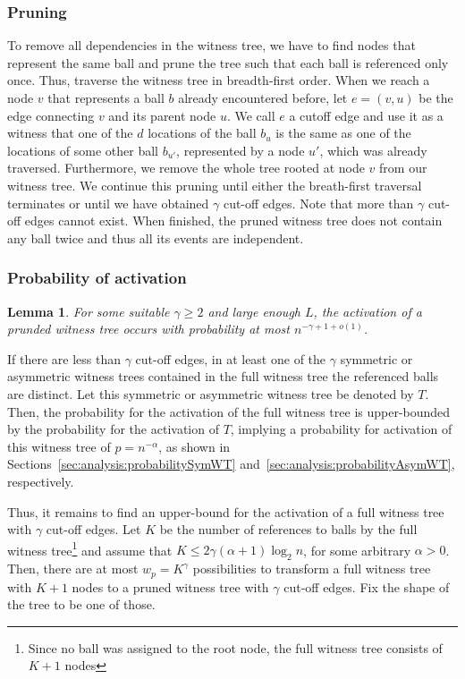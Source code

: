\documentclass[a4paper,12pt]{article}
\newtheorem{lemma}{Lemma}
\begin{document}
\subsubsection{Pruning}
\label{sec:analysis:pruningFullWT}
To remove all dependencies in the witness tree, we have to find nodes that represent the same ball and prune the tree such that each ball is referenced only once. Thus, traverse the witness tree in breadth-first order. When we reach a node $v$ that represents a ball $b$ already encountered before, let $e = (v,u)$ be the edge connecting $v$ and its parent node $u$. We call $e$ a cutoff edge and use it as a witness that one of the $d$ locations of the ball $b_u$ is the same as one of the locations of some other ball $b_{u'}$, represented by a node $u'$, which was already traversed. Furthermore, we remove the whole tree rooted at node $v$ from our witness tree. We continue this pruning until either the breath-first traversal terminates or until we have obtained $\gamma$ cut-off edges. Note that more than $\gamma$ cut-off edges cannot exist. When finished, the pruned witness tree does not contain any ball twice and thus all its events are independent. 

\subsubsection{Probability of activation}
\label{sec:analysis:probabilityFullWT}
\begin{lemma}\label{lemma:fwt:activation}
For some suitable $\gamma \geq 2$ and large enough $L$, the activation of a prunded witness tree occurs with probability at most $n^{-\gamma +1 +o(1)}$.
\end{lemma}
If there are less than $\gamma$ cut-off edges, in at least one of the $\gamma$ symmetric or asymmetric witness trees contained in the full witness tree the referenced balls are distinct. Let this symmetric or asymmetric witness tree be denoted by $T$. Then, the probability for the activation of the full witness tree is upper-bounded by the probability for the activation of $T$, implying a probability for activation of this witness tree of $p = n^{- \alpha}$, as shown in Sections~\ref{sec:analysis:probabilitySymWT} and~\ref{sec:analysis:probabilityAsymWT}, respectively.

Thus, it remains to find an upper-bound for the activation of a full witness tree with $\gamma$ cut-off edges. Let $K$ be the number of references to balls by the full witness tree\footnote{Since no ball was assigned to the root node, the full witness tree consists of $K+1$ nodes} and assume that $K  \leq 2 \gamma\left(\alpha+1\right) \log_2 n$, for some arbitrary $\alpha > 0$. Then, there are at most $w_p=K^\gamma$ possibilities to transform a full witness tree with $K+1$ nodes to a pruned witness tree with $\gamma$ cut-off edges. Fix the shape of the tree to be one of those. 
\end{document}
